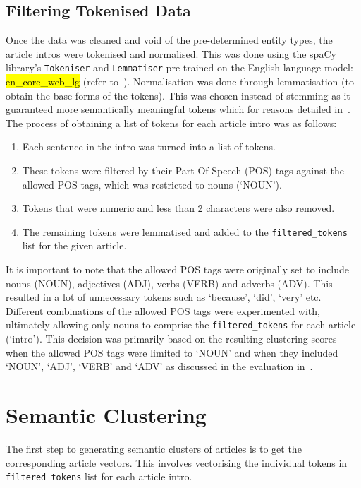 \subsection*{Filtering Tokenised Data} \label{filtered_tokens}
Once the data was cleaned and void of the pre-determined entity types, the article intros were tokenised and normalised. This was done using the spaCy library's \texttt{Tokeniser} and \texttt{Lemmatiser} pre-trained on the English language model: \hl{en\_core\_web\_lg} (refer to~). Normalisation was done through lemmatisation (to obtain the base forms of the tokens). This was chosen instead of stemming as it guaranteed more semantically meaningful tokens which for reasons detailed in~. The process of obtaining a list of tokens for each article intro was as follows:
\begin{enumerate}
    \item Each sentence in the intro was turned into a list of tokens.
    \item These tokens were filtered by their Part-Of-Speech (POS) tags against the allowed POS tags, which was restricted to nouns (`NOUN').
    \item Tokens that were numeric and less than 2 characters were also removed. 
    \item The remaining tokens were lemmatised and added to the \texttt{filtered\_tokens} list for the given article.
\end{enumerate}

It is important to note that the allowed POS tags were originally set to include nouns (NOUN), adjectives (ADJ), verbs (VERB) and adverbs (ADV). This resulted in a lot of unnecessary tokens such as ‘because’, ‘did’, ‘very’ etc. Different combinations of the allowed POS tags were experimented with, ultimately allowing only nouns to comprise the \texttt{filtered\_tokens} for each article (`intro'). This decision was primarily based on the resulting clustering scores when the allowed POS tags were limited to `NOUN' and when they included `NOUN', `ADJ', `VERB' and `ADV' as discussed in the evaluation in~.

\section{Semantic Clustering} \label{s:semantic_clustering}

The first step to generating semantic clusters of articles is to get the corresponding article vectors. This involves vectorising the individual tokens in \texttt{filtered\_tokens} list for each article intro.

